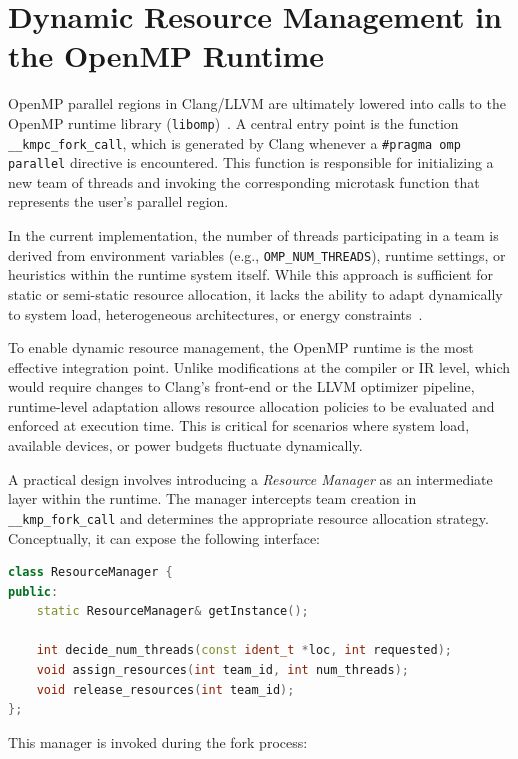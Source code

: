 \section{Dynamic Resource Management in the OpenMP Runtime}

OpenMP parallel regions in Clang/LLVM are ultimately lowered into calls to the OpenMP runtime library (\texttt{libomp})~\parencite{noauthor_welcome_nodate}. A central entry point is the function \texttt{\_\_kmpc\_fork\_call}, which is generated by Clang whenever a \texttt{\#pragma omp parallel} directive is encountered. This function is responsible for initializing a new team of threads and invoking the corresponding microtask function that represents the user's parallel region.

In the current implementation, the number of threads participating in a team is derived from environment variables (e.g., \texttt{OMP\_NUM\_THREADS}), runtime settings, or heuristics within the runtime system itself. While this approach is sufficient for static or semi-static resource allocation, it lacks the ability to adapt dynamically to system load, heterogeneous architectures, or energy constraints~\parencite{noauthor_welcome_nodate}.

To enable dynamic resource management, the OpenMP runtime is the most effective integration point. Unlike modifications at the compiler or IR level, which would require changes to Clang's front-end or the LLVM optimizer pipeline, runtime-level adaptation allows resource allocation policies to be evaluated and enforced at execution time. This is critical for scenarios where system load, available devices, or power budgets fluctuate dynamically.

A practical design involves introducing a \textit{Resource Manager} as an intermediate layer within the runtime. The manager intercepts team creation in \texttt{\_\_kmp\_fork\_call} and determines the appropriate resource allocation strategy. Conceptually, it can expose the following interface:

\begin{lstlisting}[language=C++]
class ResourceManager {
public:
    static ResourceManager& getInstance();

    int decide_num_threads(const ident_t *loc, int requested);
    void assign_resources(int team_id, int num_threads);
    void release_resources(int team_id);
};
\end{lstlisting}

This manager is invoked during the fork process:

